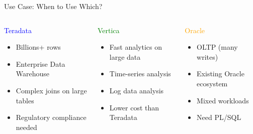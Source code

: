 \documentclass{beamer}
\begin{document}
	\begin{frame}{Use Case: When to Use Which?}
		\begin{columns}[T]
			\begin{block}{\textcolor{blue}{Teradata}}
				\begin{itemize}
					\small
					\item Billions+ rows
					\item Enterprise Data Warehouse
					\item Complex joins on large tables
					\item Regulatory compliance needed
				\end{itemize}
			\end{block}
			
			\begin{block}{\textcolor{green}{Vertica}}
				\begin{itemize}
					\small
					\item Fast analytics on large data
					\item Time-series analysis
					\item Log data analysis
					\item Lower cost than Teradata
				\end{itemize}
			\end{block}
			
			\begin{block}{\textcolor{orange}{Oracle}}
				\begin{itemize}
					\small
					\item OLTP (many writes)
					\item Existing Oracle ecosystem
					\item Mixed workloads
					\item Need PL/SQL
				\end{itemize}
			\end{block}
		\end{columns}
	\end{frame}
	
\end{document}
